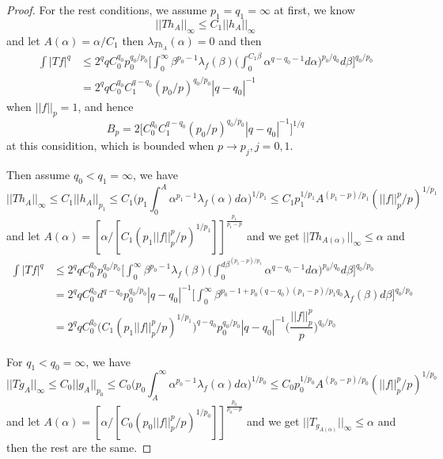 \documentclass[lang=en, color=blue, ]{elegantbook}
\newcommand{\dstrb}[1]{\lambda_{#1}}
\begin{document}
\begin{proof}
    For the rest conditions, we assume $p_1 = q_1 = \infty$ at first, we know
    \[
    ||Th_A||_{\infty} \leq C_1||h_A||_{\infty}
    \]
    and let $A(\alpha) = \alpha/C_1$ then $\dstrb{Th_A}(\alpha) = 0$ and then
    \[
    \begin{aligned}
    \int|Tf|^q &\leq 2^qq C_0^{q_0}p_0^{q_0/p_0}\Big[\int_0^{\infty}\beta^{p_0-1}\dstrb{f}(\beta)\Big(\int_0^{C_1\beta} \alpha^{q-q_0-1}d\alpha\Big)^{p_0/q_0}d\beta\Big]^{q_0/p_0} \\
    &=2^qq C_0^{q_0}C_1^{q-q_0}(p_0/p)^{q_0/p_0}|q-q_0|^{-1}
    \end{aligned}
    \]
    when $||f||_p = 1$, and hence
    \[
    B_p = 2\Big[ C_0^{q_0}C_1^{q-q_0}(p_0/p)^{q_0/p_0}|q-q_0|^{-1}\Big]^{1/q}
    \]
    at this considition, which is bounded when $p\to p_j, j = 0,1$.\par
    Then assume $q_0 < q_1 = \infty$, we have
    \[||Th_A||_{\infty} \leq C_1||h_A||_{p_1} \leq C_1\Big(p_1\int_0^A \alpha^{p_1-1}\dstrb{f}(\alpha)d\alpha\Big)^{1/p_1} \leq C_1p_1^{1/p_1}A^{(p_1-p)/p_1}(||f||_p^p/p)^{1/p_1}\]
    and let $A(\alpha) = [\alpha/[C_1(p_1||f||_p^p/p)^{1/p_1}]]^{\tfrac{p_1}{p_1-p}}$ and we get $||Th_{A(\alpha)}||_{\infty} \leq \alpha$ and
    \[
    \begin{aligned}
    \int|Tf|^q &\leq 2^qq C_0^{q_0}p_0^{q_0/p_0}\Big[\int_0^{\infty}\beta^{p_0-1}\dstrb{f}(\beta)\Big(\int_0^{d\beta^{(p_1-p)/p_1}} \alpha^{q-q_0-1}d\alpha\Big)^{p_0/q_0}d\beta\Big]^{q_0/p_0} \\
    &=2^qq C_0^{q_0}d^{q-q_0}p_0^{q_0/p_0}|q-q_0|^{-1}\Big[\int_0^{\infty}\beta^{p_0-1+p_0(q-q_0)(p_1-p)/p_1q_0}\dstrb{f}(\beta)d\beta\Big]^{q_0/p_0} \\
    & = 2^qq C_0^{q_0}\Big(C_1(p_1||f||_p^p/p)^{1/p_1}\Big)^{q-q_0}p_0^{q_0/p_0}|q-q_0|^{-1}\Big(\dfrac{||f||_p^p}{p}\Big)^{q_0/p_0}
    \end{aligned}
    \]\par
    For $q_1 < q_0 = \infty$, we have
     \[||Tg_A||_{\infty} \leq C_0||g_A||_{p_0} \leq C_0\Big(p_0\int_A^{\infty} \alpha^{p_0-1}\dstrb{f}(\alpha)d\alpha\Big)^{1/p_0} \leq C_0p_0^{1/p_0}A^{(p_0-p)/p_0}(||f||_p^p/p)^{1/p_0}\]
    and let $A(\alpha) = [\alpha/[C_0(p_0||f||_p^p/p)^{1/p_0}]]^{\tfrac{p_0}{p_0-p}}$ and we get $||T_{g_{A(\alpha)}}||_{\infty} \leq \alpha$ and then the rest are the same.
\end{proof}
\end{document}
